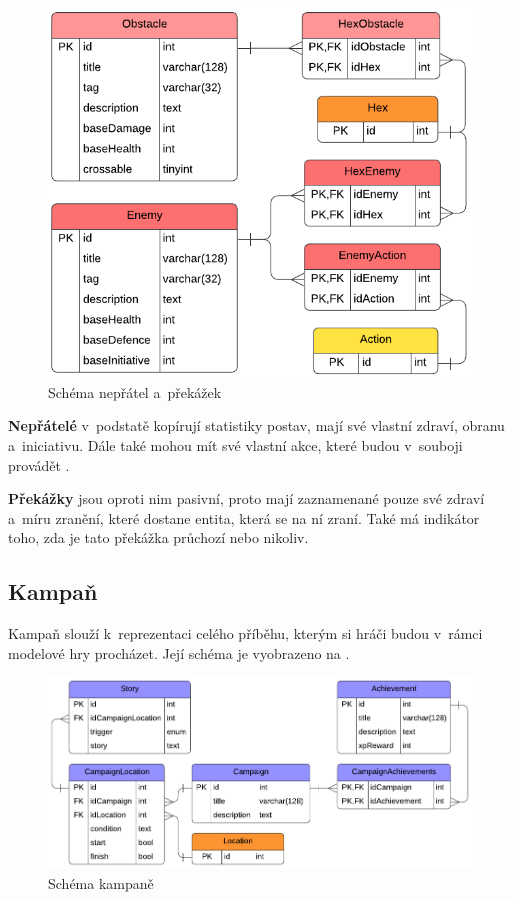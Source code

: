 \begin{figure}[h]
    \centering
    \includegraphics{../../shared/diagrams/er_enemy_obstacle.pdf}
    \caption{Schéma nepřátel a~překážek}
    \label{diag:er_enemy_obstacle}
\end{figure}

\textbf{Nepřátelé} v~podstatě kopírují statistiky postav, mají své vlastní zdraví, obranu a~iniciativu. Dále také mohou mít své vlastní akce, které budou v~souboji provádět .

\textbf{Překážky} jsou oproti nim pasivní, proto mají zaznamenané pouze své zdraví a~míru zranění, které dostane entita, která se na ní zraní. Také má indikátor toho, zda je tato překážka průchozí  nebo nikoliv.


\subsection{Kampaň}
\label{subsec:schema_campaign}

Kampaň slouží k~reprezentaci celého příběhu, kterým si hráči budou v~rámci modelové hry procházet. Její schéma je vyobrazeno na .

\begin{figure}[h]
    \centering
    \includegraphics[scale=0.8]{../../shared/diagrams/er_campaign.pdf}
    \caption{Schéma kampaně}
    \label{diag:er_campaign}
\end{figure}

